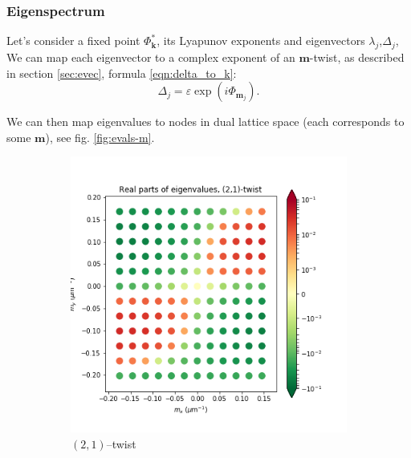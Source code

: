 \documentclass[a4paper,10pt]{article}
\renewcommand*{\vec}[1]{\mathbf{#1}}
\newcommand*{\eps}{\varepsilon}
\newcommand*{\F}{\Phi} %
\newcommand*{\FP}{\Phi^*}%
\newcommand*{\D}{\Delta}%
\begin{document}
\subsubsection{Eigenspectrum}
Let's consider a fixed point $\FP_{\vec{k}}$, its Lyapunov exponents and eigenvectors $\lambda_j$,$\D_j$, We can map each eigenvector to a complex exponent of an $\vec{m}$-twist, as described in section \ref{sec:evec}, formula \eqref{eqn:delta_to_k}:
\begin{equation}
\D_j = \eps \exp(i\F_{\vec{m}_j}).
\label{eqn:delta_to_m}
\end{equation}

We can then map eigenvalues to nodes in dual lattice space (each corresponds to some $\vec{m}$), see fig. \ref{fig:evals-m}.

\begin{figure}[h]
\begin{subfigure}[h]{.55\textwidth}
  \centering
 \includegraphics[width=.9\textwidth]{assets/theory-2019-09-05-163844330-50c.png}
  \caption{$(2,1)$--twist}
\end{subfigure}
\begin{subfigure}[h]{.55\textwidth}
  \centering

\end{subfigure}
\end{figure}
\end{document}
